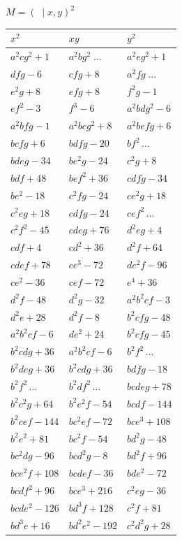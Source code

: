 \documentclass[11pt]{article}
\begin{document}
\begin{center}
$M=(\;\mid x,y)^{2}$

\medskip
\begin{tabular}{|l|l|l|}
\hline
$x^{2}$ & $xy$ & $y^{2}$\\
\hline
$a^{2}cg^{2}+1$ & $a^{2}bg^{2}\;\ldots$ & $a^{2}eg^{2}+1$\\
$dfg-6$ & $cfg+8$ & $a^{2}fg\;\ldots$\\
$e^{2}g+8$ & $efg+8$ & $f^{2}g-1$\\
$ef^{2}-3$ & $f^{3}-6$ & $a^{2}bdg^{2}-6$\\
$a^{2}bfg-1$ & $a^{2}bcg^{2}+8$ & $a^{2}befg+6$\\
$bcfg+6$ & $bdfg-20$ & $bf^{2}\,\ldots$\\
$bdeg-34$ & $be^{2}g-24$ & $c^{2}g+8$\\
$bdf+48$ & $bef^{2}+36$ & $cdfg-34$\\
$be^{2}-18$ & $c^{2}fg-24$ & $ce^{2}g+18$\\
$c^{2}eg+18$ & $cdfg-24$ & $cef^{2}\,\ldots$\\
$c^{2}f^{2}-45$ & $cdeg+76$ & $d^{2}eg+4$\\
$cdf+4$ & $cd^{2}+36$ & $d^{2}f+64$\\
$cdef+78$ & $ce^{3}-72$ & $de^{2}f-96$\\
$ce^{2}-36$ & $cef-72$ & $e^{4}+36$\\
$d^{2}f-48$ & $d^{2}g-32$ & $a^{2}b^{2}cf-3$\\
$d^{2}e+28$ & $d^{2}f-8$ & $b^{2}cfg-48$\\
$a^{2}b^{2}cf-6$ & $de^{2}+24$ & $b^{2}cfg-45$\\
$b^{2}cdg+36$ & $a^{2}b^{2}cf-6$ & $b^{2}f^{2}\,\ldots$\\
$b^{2}deg+36$ & $b^{2}cdg+36$ & $bdfg-18$\\
$b^{2}f^{2}\,\ldots$ & $b^{2}df^{2}\,\ldots$ & $bcdeg+78$\\
$b^{2}c^{2}g+64$ & $b^{2}e^{2}f-54$ & $bcdf-144$\\
$b^{2}cef-144$ & $bc^{2}ef-72$ & $bce^{3}+108$\\
$b^{2}e^{2}+81$ & $bc^{2}f-54$ & $bd^{2}g-48$\\
$bc^{2}dg-96$ & $bcd^{2}g-8$ & $bd^{2}f+96$\\
$bce^{2}f+108$ & $bcdef-36$ & $bde^{2}-72$\\
$bcdf^{2}+96$ & $bce^{3}+216$ & $c^{2}eg-36$\\
$bcde^{2}-126$ & $bd^{3}f+128$ & $c^{2}f+81$\\
$bd^{3}e+16$ & $bd^{2}e^{2}-192$ & $c^{2}d^{2}g+28$\\

\end{tabular}
\end{center}
\end{document}
